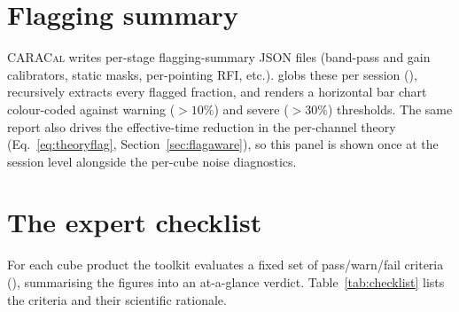 \documentclass[11pt,a4paper]{article}
\begin{document}
\section{Flagging summary}\label{sec:flags}
\textsc{CARACal} writes per-stage flagging-summary JSON files (band-pass and
gain calibrators, static masks, per-pointing RFI, etc.). 
globs these per session (), recursively extracts every
flagged fraction, and renders a horizontal bar chart colour-coded against
warning ($>10\%$) and severe ($>30\%$) thresholds. The same report also drives
the effective-time reduction in the per-channel theory
(Eq.~\ref{eq:theoryflag}, Section~\ref{sec:flagaware}), so this panel is shown
once at the session level alongside the per-cube noise diagnostics.

\section{The expert checklist}\label{sec:checklist}
For each cube product the toolkit evaluates a fixed set of pass/warn/fail
criteria (), summarising the figures into an
at-a-glance verdict. Table~\ref{tab:checklist} lists the criteria and their
scientific rationale.
\end{document}
